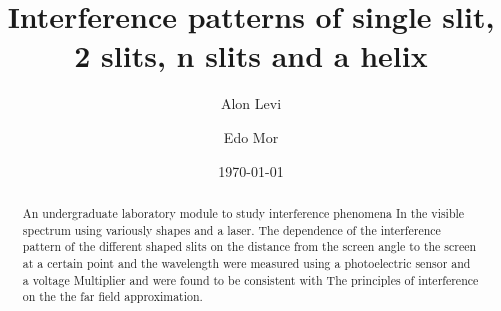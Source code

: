 \documentclass[a4paper, amsfonts, amssymb, amsmath, reprint, showkeys, nofootinbib, twoside]{revtex4-1}
\begin{document}
    \title{Interference patterns of single slit, 2 slits, n slits and a helix}
    \author{Alon Levi}
    \author{Edo Mor}
    \date{\today}
    \begin{abstract}
        An undergraduate laboratory module to study interference phenomena In the visible spectrum using variously shapes and a laser.
        The dependence of the interference pattern of the different shaped slits on the distance from the screen angle to the screen at a certain point and the wavelength were measured
        using a photoelectric sensor and a voltage Multiplier and were found to be consistent with The principles of interference on the the far field approximation.
    \end{abstract}
    \maketitle

    
    
    
    
\end{document}
